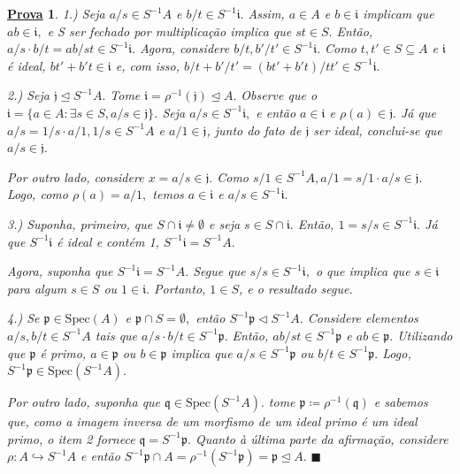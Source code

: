 \documentclass{article}
\newtheorem*{proof*}{\underline{Prova}}
\renewcommand\qedsymbol{$\blacksquare$}
\begin{document}
\begin{proof*}
  1.) Seja \(a/s\in S^{-1}A\) e \(b/t\in S^{-1}\mathfrak{i}.\) Assim, \(a\in A\) e \(b\in \mathfrak{i}\) implicam
  que \(ab\in \mathfrak{i},\) e S ser fechado por multiplicação implica que \(st\in S.\) Então, \(a/s \cdot b/t = ab/st\in S^{-1}\mathfrak{i}.\)
  Agora, considere \(b/t, b'/t'\in S^{-1}\mathfrak{i}.\) Como \(t, t'\in S\subseteq A\) e \(\mathfrak{i}\) é ideal, \(bt'+b't\in \mathfrak{i}\) e,
  com isso, \(b/t + b'/t' = (bt'+b't)/t t'\in S^{-1}\mathfrak{i}.\)

  2.) Seja \(\mathfrak{j}\trianglelefteq{S^{-1}A}.\) Tome \(\mathfrak{i} = \rho^{-1}(\mathfrak{j})\trianglelefteq{A}.\) Observe que o
  \(\mathfrak{i} = \{a\in A:\exists s\in S, a/s\in \mathfrak{j}\}\). Seja \(a/s\in S^{-1}\mathfrak{i},\) e então
  \(a\in \mathfrak{i}\) e \(\rho (a)\in \mathfrak{j}.\) Já que \(a/s = 1/s \cdot a/1, 1/s\in S^{-1}A\) e \(a/1\in \mathfrak{j}\),
  junto do fato de \(\mathfrak{j}\) ser ideal, conclui-se que \(a/s\in \mathfrak{j}.\)

  Por outro lado, considere \(x=a/s\in \mathfrak{j}.\) Como \(s/1\in S^{-1}A, a/1 = s/1 \cdot a/s\in \mathfrak{j}.\) Logo, 
  como \(\rho (a) = a/1,\) temos \(a\in \mathfrak{i}\) e \(a/s\in S^{-1}\mathfrak{i}.\)

  3.) Suponha, primeiro, que \(S\cap \mathfrak{i} \neq\emptyset\) e seja \(s\in S\cap \mathfrak{i}.\) Então,
  \(1 = s/s\in S^{-1}\mathfrak{i}.\) Já que \(S^{-1}\mathfrak{i}\) é ideal e contém 1, \(S^{-1}\mathfrak{i} = S^{-1}A.\)

  Agora, suponha que \(S^{-1}\mathfrak{i} = S^{-1}A.\) Segue que \(s/s\in S^{-1}\mathfrak{i},\) o que implica que \(s\in \mathfrak{i}\) para algum
  \(s\in S\) ou \(1\in \mathfrak{i}.\) Portanto, \(1\in S\), e o resultado segue.

  4.) Se \(\mathfrak{p}\in \mathrm{Spec}(A)\) e \(\mathfrak{p}\cap S = \emptyset,\) então \(S^{-1}\mathfrak{p}\vartriangleleft S^{-1}A.\)
  Considere elementos \(a/s, b/t\in S^{-1}A\) tais que \(a/s \cdot b/t\in S^{-1}\mathfrak{p}.\) Então, \(ab/st\in S^{-1}\mathfrak{p}\) e \(ab\in \mathfrak{p}.\)
  Utilizando que \(\mathfrak{p}\) é primo, \(a\in \mathfrak{p}\) ou \(b\in \mathfrak{p}\) implica que \(a/s\in S^{-1}\mathfrak{p}\) ou \(b/t\in S^{-1}\mathfrak{p}.\)
  Logo, \(S^{-1}\mathfrak{p}\in \mathrm{Spec}(S^{-1}A).\)

  Por outro lado, suponha que \(\mathfrak{q}\in \mathrm{Spec}(S^{-1}A).\) tome \(\mathfrak{p}\coloneqq \rho^{-1}(\mathfrak{q})\) e
  sabemos que, como a imagem inversa de um morfismo de um ideal primo é um ideal primo, o item 2 fornece \(\mathfrak{q} = S^{-1}\mathfrak{p}.\) 
  Quanto à última parte da afirmação, considere \(\rho :A\hookrightarrow S^{-1}A\) e então \(S^{-1}\mathfrak{p}\cap A = \rho^{-1}(S^{-1}\mathfrak{p}) = \mathfrak{p} \trianglelefteq{A}.\) \qedsymbol
\end{proof*}
\end{document}
